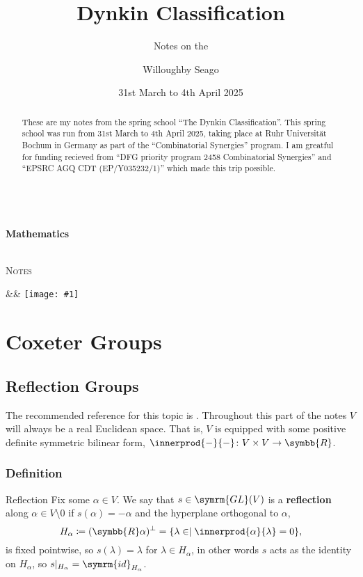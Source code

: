 \documentclass[fleqn, a4paper, openany]{memoir}
\title{Dynkin Classification}
\author{Willoughby Seago}
\date{31st March to 4th April 2025}
\subtitle{Notes on the}
\makeatletter
\newcommand{\@subtitle}{Mathematics}
\newcommand{\@subsubtitle}{Notes}
\newcommand{\titlepage}{%
    \begin{titlingpage}
        \begingroup%
        \raggedleft
        \vspace*{\baselineskip}
        {\LARGE \theauthor}\\[0.167\textheight]
        {\large\bfseries \@subtitle}\\[\baselineskip]
        {\HUGE\bfseries\textcolor{gray}{\thetitle}}\\[\baselineskip]
        {\large\thedate}\par
        \vspace*{2\baselineskip}
        \vfill
        {\LARGE\scshape \@subsubtitle}\par
        \vspace*{3\baselineskip}
        \endgroup
    \end{titlingpage}
}
\newcommand{\innertitlepage}[1]{%
    \maketitle  %
    \begin{abstract}  %
        \abstracttext
    \end{abstract}
    \begingroup\centering
    \vfill
    \ifx&#1&%
    \else
    \texttt{[image: \#1]}
    \fi
    \vfill
    \endgroup
}
\newcommand{\abstracttext}{These are my notes from the spring school \enquote{The Dynkin Classification}. This spring school was run from 31st March to 4th April 2025, taking place at Ruhr Universit\"at Bochum in Germany as part of the \enquote{Combinatorial Synergies} program. I am greatful for funding recieved from \enquote{DFG priority program 2458 Combinatorial Synergies} and \enquote{EPSRC AGQ CDT (EP/Y035232/1)} which made this trip possible.}
\newcommand{\define}[1]{\textbf{#1}}
\newcommand{\reals}{\symbb{R}}
\newcommand{\generalLinear}{\symrm{GL}}
\newcommand{\id}{\symrm{id}}
\makeatother
\begin{document}
    \frontmatter
    \titlepage
    \innertitlepage{}
    \newpage
    \tableofcontents
    \mainmatter
    
    
    
    \part{Coxeter Groups}
    \chapter{Reflection Groups}
    The recommended reference for this topic is \cite{Humphreys.CoxeterGroups}.
    Throughout this part of the notes \(V\) will always be a real Euclidean space.
    That is, \(V\) is equipped with some positive definite symmetric bilinear form, \(\innerprod{-}{-} \colon V \times V \to \reals\).
    
    \section{Definition}
    \begin{dfn}{Reflection}{}
        Fix some \(\alpha \in V\).
        We say that \(s \in \generalLinear(V)\) is a \define{reflection} along \(\alpha \in V \setminus 0\) if \(s(\alpha) = -\alpha\) and the hyperplane orthogonal to \(\alpha\),
        \begin{equation}
            H_\alpha \coloneq (\reals \alpha)^{\perp} = \{\lambda \in \mid \innerprod{\alpha}{\lambda} = 0\},
        \end{equation}
        is fixed pointwise, so \(s(\lambda) = \lambda\) for \(\lambda \in H_\alpha\), in other words \(s\) acts as the identity on \(H_\alpha\), so \(s|_{H_\alpha} = \id_{H_\alpha}\).
    \end{dfn}
    
\end{document}
